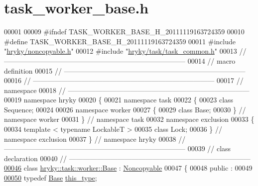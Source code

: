 \hypertarget{task__worker__base_8h_source}{\section{task\-\_\-worker\-\_\-base.\-h}
}

\begin{DoxyCode}
00001 
00009 \textcolor{preprocessor}{#ifndef TASK\_WORKER\_BASE\_H\_20111119163724359}
00010 \textcolor{preprocessor}{}\textcolor{preprocessor}{#define TASK\_WORKER\_BASE\_H\_20111119163724359}
00011 \textcolor{preprocessor}{}\textcolor{preprocessor}{#include "\hyperlink{noncopyable_8h}{hryky/noncopyable.h}"}
00012 \textcolor{preprocessor}{#include "\hyperlink{task__common_8h}{hryky/task/task_common.h}"}
00013 \textcolor{comment}{//
      ------------------------------------------------------------------------------}
00014 \textcolor{comment}{// macro definition}
00015 \textcolor{comment}{//
      ------------------------------------------------------------------------------}
00016 \textcolor{comment}{//
      ------------------------------------------------------------------------------}
00017 \textcolor{comment}{// namespace}
00018 \textcolor{comment}{//
      ------------------------------------------------------------------------------}
00019 \textcolor{keyword}{namespace }hryky
00020 \{
00021 \textcolor{keyword}{namespace }task
00022 \{
00023     \textcolor{keyword}{class }Sequence;
00024 
00026 \textcolor{keyword}{namespace }worker
00027 \{
00029     \textcolor{keyword}{class }Base;
00030 \} \textcolor{comment}{// namespace worker}
00031 \} \textcolor{comment}{// namespace task}
00032 \textcolor{keyword}{namespace }exclusion
00033 \{
00034     \textcolor{keyword}{template} < \textcolor{keyword}{typename} LockableT >
00035     \textcolor{keyword}{class }Lock;
00036 \} \textcolor{comment}{// namespace exclusion}
00037 \} \textcolor{comment}{// namespace hryky}
00038 \textcolor{comment}{//
      ------------------------------------------------------------------------------}
00039 \textcolor{comment}{// class declaration}
00040 \textcolor{comment}{//
      ------------------------------------------------------------------------------}
\hypertarget{task__worker__base_8h_source_l00046}{}\hyperlink{classhryky_1_1task_1_1worker_1_1_base}{00046} \textcolor{comment}{}\textcolor{keyword}{class }\hyperlink{classhryky_1_1task_1_1worker_1_1_base}{hryky::task::worker::Base} : \hyperlink{classhryky_1_1_noncopyable}{Noncopyable}
00047 \{
00048 \textcolor{keyword}{public} :
00049 
\hypertarget{task__worker__base_8h_source_l00050}{}\hyperlink{classhryky_1_1task_1_1worker_1_1_base_a7e479f64d3081afe38ac8c001c784b6f}{00050}     \textcolor{keyword}{typedef} \hyperlink{classhryky_1_1task_1_1worker_1_1_base}{Base}                \hyperlink{classhryky_1_1task_1_1worker_1_1_base_a7e479f64d3081afe38ac8c001c784b6f}{this_type};

\end{DoxyCode}

